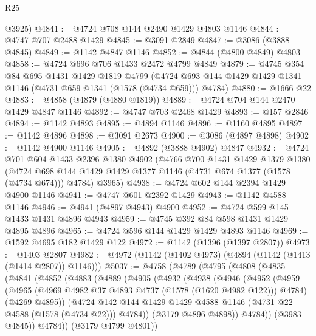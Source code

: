 \begin{lexlean}{R25}
\begin{coremodule}
      @3925)
@4841 := @4724 @708 @144 @2490 @1429 @4803 @1146
@4844 := @4747 @707 @2488 @1429
@4845 := @3091 @2849
@4847 := @3086 (@3888 @4845)
@4849 := @1142 @4847 @1146
@4852 := @4844 (@4800 @4849) @4803
@4858 := @4724 @696 @706 @1433 @2472 @4799 @4849
@4879 := @4745
    @354
    @84
    @695
    @1431
    @1429
    @1819
    @4799
    (@4724 @693 @144 @1429 @1429 @1341 @1146 (@4731 @659 @1341 (@1578 (@4734 @659))) @4784)
@4880 := @1666 @22
@4883 := @4858 (@4879 (@4880 @1819))
@4889 := @4724 @704 @144 @2470 @1429 @4847 @1146
@4892 := @4747 @703 @2468 @1429
@4893 := @157 @2846
@4894 := @1142 @4893
@4895 := @4894 @1146
@4896 := @1160 @4895
@4897 := @1142 @4896
@4898 := @3091 @2673
@4900 := @3086 (@4897 @4898)
@4902 := @1142 @4900 @1146
@4905 := @4892 (@3888 @4902) @4847
@4932 := @4724
    @701
    @604
    @1433
    @2396
    @1380
    @4902
    (@4766
      @700
      @1431
      @1429
      @1379
      @1380
      (@4724 @698 @144 @1429 @1429 @1377 @1146 (@4731 @674 @1377 (@1578 (@4734 @674))) @4784)
      @3965)
@4938 := @4724 @602 @144 @2394 @1429 @4900 @1146
@4941 := @4747 @601 @2392 @1429
@4943 := @1142 @4588 @1146
@4946 := @4941 (@4897 @4943) @4900
@4952 := @4724 @599 @145 @1433 @1431 @4896 @4943
@4959 := @4745 @392 @84 @598 @1431 @1429 @4895 @4896
@4965 := @4724 @596 @144 @1429 @1429 @4893 @1146
@4969 := @1592 @4695 @182 @1429 @122
@4972 := @1142 (@1396 (@1397 @2807))
@4973 := @1403 @2807
@4982 := @4972 (@1142 (@1402 @4973) (@4894 (@1142 (@1413 (@1414 @2807)) @1146)))
@5037 := @4758
    (@4789
      (@4795
        (@4808
          (@4835
            (@4841
              (@4852
                (@4883
                  (@4889
                    (@4905
                      (@4932
                        (@4938
                          (@4946
                            (@4952
                              (@4959
                                (@4965
                                  (@4969 @4982 @37 @4893 @4737 (@1578 (@1620 @4982 @122)))
                                  @4784)
                                (@4269 @4895))
                              (@4724
                                @142
                                @144
                                @1429
                                @1429
                                @4588
                                @1146
                                (@4731 @22 @4588 (@1578 (@4734 @22)))
                                @4784))
                            (@3179 @4896 @4898))
                          @4784))
                      (@3983 @4845))
                    @4784))
                (@3179 @4799 @4801))

\end{coremodule}
\end{lexlean}
